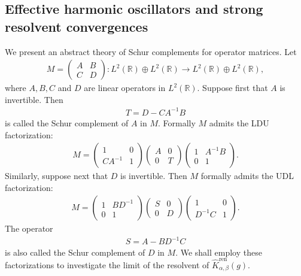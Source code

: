 \documentclass[12pt,dvipdfmx]{article}
\newcommand{\RR}{\mathbb{R}}
\begin{document}
\subsection{Effective harmonic oscillators and strong resolvent convergences}%
%
%
We present an abstract theory of Schur complements for operator matrices. Let \begin{align*}M = \begin{pmatrix} A & B\\ C & D \end{pmatrix}:L^2(\RR)\oplus L^2(\RR)\to L^2(\RR)\oplus L^2(\RR),\end{align*} where $A, B, C$ and $D$ are linear operators in $L^2(\RR)$. 
Suppose first that $A$ is invertible. 
Then 
\begin{align*}
    T = D - CA^{-1}B
\end{align*} is called the Schur complement of $A$ in $M$. 
Formally $M$ admits the LDU factorization: 
\begin{align*}
    M
    =
    \begin{pmatrix}
        1 & 0\\
        CA^{-1} & 1
    \end{pmatrix}
    \begin{pmatrix}
        A & 0\\
        0 & T
    \end{pmatrix}
    \begin{pmatrix}
        1 & A^{-1}B\\
        0 & 1
    \end{pmatrix}.
\end{align*}
Similarly, suppose next that $D$ is invertible. Then $M$ formally admits the UDL factorization:
\begin{align*}
    M
    =
    \begin{pmatrix}
        1 & BD^{-1}\\
        0 & 1
    \end{pmatrix}
    \begin{pmatrix}
        S & 0\\
        0 & D
    \end{pmatrix}
    \begin{pmatrix}
        1 & 0\\
        D^{-1}C & 1
    \end{pmatrix}.
\end{align*}
The operator
\begin{align*}
    S = A - BD^{-1}C
\end{align*}
is also called the Schur complement of $D$ in $M$. We shall employ these factorizations to investigate the limit of the resolvent of $\hat{K}^\mathrm{ren} _{\alpha,\beta}(g)$. 
\end{document}

